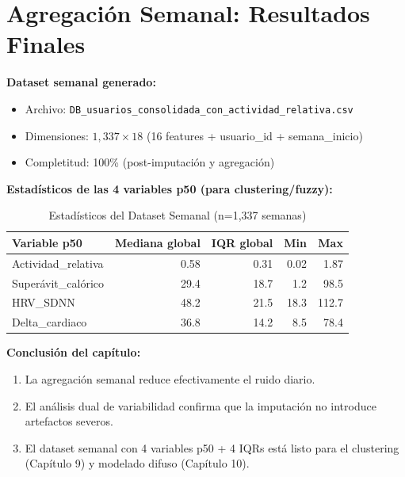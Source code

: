 \documentclass[12pt,letterpaper,twoside]{report}
\begin{document}
\section{Agregación Semanal: Resultados Finales}

\begin{calculobox}
\textbf{Dataset semanal generado:}

\begin{itemize}[noitemsep]
    \item Archivo: \texttt{DB\_usuarios\_consolidada\_con\_actividad\_relativa.csv}
    \item Dimensiones: $1,337 \times 18$ (16 features + usuario\_id + semana\_inicio)
    \item Completitud: 100\% (post-imputación y agregación)
\end{itemize}

\textbf{Estadísticos de las 4 variables p50 (para clustering/fuzzy):}

\begin{table}[H]
\centering
\begin{tabular}{@{}lrrrr@{}}
\toprule
\textbf{Variable p50} & \textbf{Mediana global} & \textbf{IQR global} & \textbf{Min} & \textbf{Max} \\
\midrule
Actividad\_relativa     & 0.58 & 0.31 & 0.02 & 1.87 \\
Superávit\_calórico     & 29.4 & 18.7 & 1.2  & 98.5 \\
HRV\_SDNN               & 48.2 & 21.5 & 18.3 & 112.7 \\
Delta\_cardiaco         & 36.8 & 14.2 & 8.5  & 78.4 \\
\bottomrule
\end{tabular}
\caption{Estadísticos del Dataset Semanal (n=1,337 semanas)}
\label{tab:weekly_stats}
\end{table}
\end{calculobox}

\begin{conclusionbox}
\textbf{Conclusión del capítulo:}

\begin{enumerate}[noitemsep]
    \item La agregación semanal reduce efectivamente el ruido diario.
    \item El análisis dual de variabilidad confirma que la imputación no introduce artefactos severos.
    \item El dataset semanal con 4 variables p50 + 4 IQRs está listo para el clustering (Capítulo 9) y modelado difuso (Capítulo 10).
\end{enumerate}
\end{conclusionbox}
\end{document}
